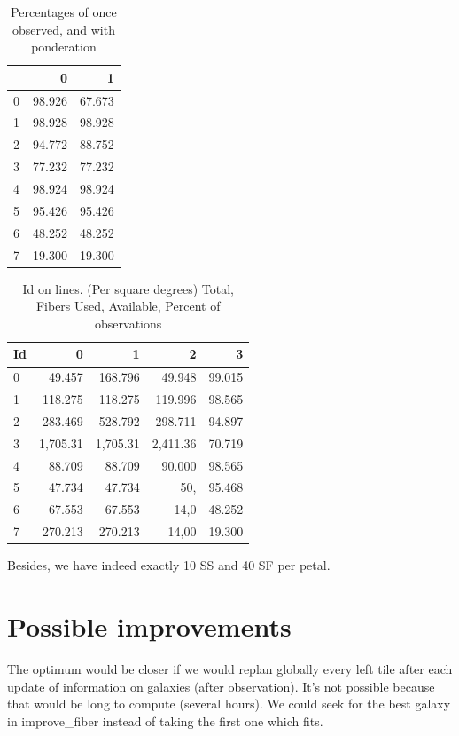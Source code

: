 \documentclass[10pt]{extarticle}
\begin{document}
\begin{multicols}{2}
\begin{table}[H]\begin{center} 
\begin{tabular}{l|rr}
	~ &         0 &      1 \\ \hline
  0   & 98.926 & 67.673 \\ 
  1   & 98.928 & 98.928 \\ 
  2   & 94.772 & 88.752 \\ 
  3   & 77.232 & 77.232 \\ 
  4   & 98.924 & 98.924 \\ 
  5   & 95.426 & 95.426 \\ 
  6   & 48.252 & 48.252 \\ 
  7   & 19.300 & 19.300 \\ 
\end{tabular}
\caption{Percentages of once observed, and with ponderation} 
\end{center}\end{table}


\begin{table}[H]\begin{center}
\caption{Id on lines. (Per square degrees) Total, Fibers Used, Available, Percent of observations}
\begin{tabular}{l|rrrr} 
   Id &          0  &           1  &           2  &           3 \\ \hline
   0  &      49.457  &     168.796  &      49.948  &      99.015   \\
   1  &     118.275  &     118.275  &     119.996  &      98.565   \\
   2  &     283.469  &     528.792  &     298.711  &      94.897   \\
   3  &    1,705.31  &    1,705.31  &    2,411.36  &      70.719   \\
   4  &      88.709  &      88.709  &      90.000  &      98.565   \\
   5  &      47.734  &      47.734  &         50,  &      95.468   \\
   6  &      67.553  &      67.553  &        14,0  &      48.252   \\
   7  &     270.213  &     270.213  &       14,00  &      19.300   \\
\end{tabular}\end{center}
 \end{table}

 Besides, we have indeed exactly 10 SS and 40 SF per petal.

\section{Possible improvements}
The optimum would be closer if we would replan globally every left tile after each update of information on galaxies (after observation). It's not possible because that would be long to compute (several hours).
We could seek for the best galaxy in improve\_fiber instead of taking the first one which fits.
\end{multicols}
\end{document}
